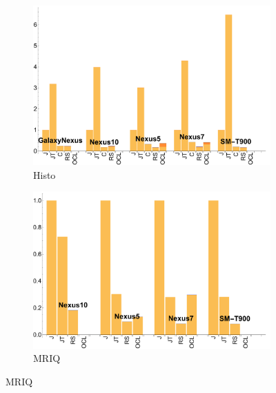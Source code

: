 \begin{figure}[ht]
  \begin{subfigure}[b]{0.5\textwidth}
      \centering
      \includegraphics[width=\textwidth]{data/Histogram_time.pdf}
      \caption{Histo}\label{fig:histo}
  \end{subfigure}
  \begin{subfigure}[b]{0.5\textwidth}
      \centering
      \includegraphics[width=\textwidth]{data/Mriq_time.pdf}
      \caption{MRIQ}
      \label{fig:MRIQ}
  \end{subfigure}


\end{figure}

